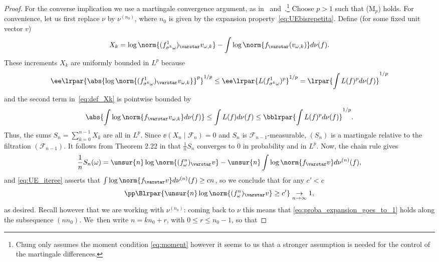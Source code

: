 \begin{proof}
For the converse implication we use a martingale convergence argument, as in~\cite[Lem.\,4.3.5]{liu_thesis} and~\cite[Prop.\,2.2]{chung}.\footnote{Chung only assumes the moment condition \eqref{eq:moment} however it seems to us that a stronger assumption is needed for the
control of the martingale differences.} Choose $p>1$ such that
(M$_{p}$) holds.
For convenience, let us first replace $\nu$ by $\nu^{(n_0)}$, where $n_0$ is given by the expansion property~\eqref{eq:UEbisrepetita}.
Define (for some fixed unit vector $v$)
\begin{equation}\label{eq:def_Xk}
X_k = \log\norm{ (f^1_{\sigma^k\omega})_\varstar v_{\omega, k}} -
\int \log\norm{ f_\varstar ( v_{\omega, k})} d\nu(f).
\end{equation}
These increments $ X_k $ are uniformly bounded in $L^p$ because
\begin{equation*}
\ee\lrpar{\abs{\log\norm{ (f^1_{\sigma^k\omega})_\varstar v_{\omega, k}}}^p }^{1/p} \leq
\ee\lrpar{ L(f^1_{\sigma^k\omega})^p}^{1/p} = \lrpar{\int L(f)^p d\nu(f)}^{1/p}
\end{equation*}
and the second term in~\eqref{eq:def_Xk} is pointwise bounded by
\begin{equation*}
\abs{\int \log\norm{ f_\varstar v_{\omega, k}} d\nu(f)} \leq \int L(f) d\nu(f) \leq \bblrpar{\int L(f)^p d\nu(f)}^{1/p}.
\end{equation*}
Thus, the sums $S_n = \sum_{k=0}^{n-1} X_k$ are all in $L^p$. Since $\ee({X_{n}\mid \mathcal F_{n}})= 0$ and $S_n$ is $\mathcal{F}_{n-1}$-measurable, $(S_n)$ is a martingale relative to the filtration $(\mathcal F_{n-1})$.
It follows from Theorem 2.22 in \cite[\S 2.7]{hall-heyde} that
$\frac{1}{n}S_n$ converges to $0$ in probability and in $L^p$.
Now, the chain rule gives
\begin{equation*}
\frac{1}{n} S_n(\omega)=
\unsur{n}\log \norm { (f^n_\omega)_\varstar v} - \unsur{n} \int \log \norm { f_\varstar v} d\nu^{(n)}(f),
\end{equation*}
and \eqref{eq:UE_iteree} asserts that
$\int \log {\norm{f_\varstar v}} d\nu^{(n)}(f) \geq c n$, so we conclude that for any $c'<c$
\begin{equation}\label{eq:proba_expansion_goes_to_1}
\pp\Blrpar{ \unsur{n}\log \norm{ (f^n_\omega)_\varstar v} \geq c'} \underset{n\to\infty}{\to} 1,
\end{equation}
as desired. Recall however that we are working with $\nu^{(n_0)}$:
coming back to $\nu$ this means that \eqref{eq:proba_expansion_goes_to_1} holds
along the subsequence $(nn_0)$. We~then write $n = kn_0+ r$, with $0\leq r \leq n_0-1$, so that

\end{proof}
